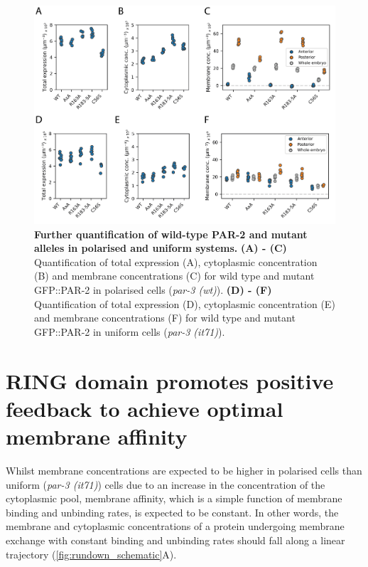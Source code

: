 \documentclass[12pt]{"report"}
\newcommand{\mycaption}[2]{\caption[#1]{\textbf{#1.} #2}}
\begin{document}
\begin{figure}
\includegraphics[scale=0.9]{par2_misc_mutants_detailed_quantification}
\centering
\mycaption{Further quantification of wild-type PAR-2 and mutant alleles in polarised and uniform systems}{
\textbf{(A) - (C)} Quantification of total expression (A), cytoplasmic concentration (B) and membrane concentrations (C) for wild type and mutant GFP::PAR-2 in polarised cells (\textit{par-3 (wt)}). 
\textbf{(D) - (F)} Quantification of total expression (D), cytoplasmic concentration (E) and membrane concentrations (F) for wild type and mutant GFP::PAR-2 in uniform cells (\textit{par-3 (it71)}). 
}
\label{fig:par2_misc_mutants_detailed_quantification}
\end{figure}




\section{RING domain promotes positive feedback to achieve optimal membrane affinity}
\label{section:par2_rundown}

Whilst membrane concentrations are expected to be higher in polarised cells than uniform (\textit{par-3 (it71)}) cells due to an increase in the concentration of the cytoplasmic pool, membrane affinity, which is a simple function of membrane binding and unbinding rates, is expected to be constant. In other words, the membrane and cytoplasmic concentrations of a protein undergoing membrane exchange with constant binding and unbinding rates should fall along a linear trajectory (\cref{fig:rundown_schematic}A).\\
\end{document}
